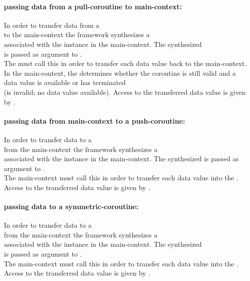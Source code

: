 \paragraph*{passing data from a pull-coroutine to main-context:}
In order to transfer data from a\\
\pullcoro to the main-context the framework synthesizes a\\
\pushcoro associated
with the \pullcoro instance in the main-context. The synthesized\\
\pushcoro is passed as argument to \corofunction.\\
The \corofunction must call this \pushcoroop in order to transfer each
data value back to the main-context.\\
In the main-context, the \pullcorobool determines whether the coroutine is still
valid and a data value is available or \corofunction has terminated\\
(\pullcoro is invalid; no data value available). Access to the transferred data
value is given by \pullcoroget.

\paragraph*{passing data from main-context to a push-coroutine:}
In order to transfer data to a\\
\pushcoro from the main-context the framework synthesizes a\\
\pullcoro associated with the \pushcoro instance in the main-context. The
synthesized \pullcoro is passed as argument to \corofunction.\\
The main-context must call this \pushcoroop in order to transfer each data value
into the \corofunction.\\
Access to the transferred data value is given by \pullcoroget.

\paragraph*{passing data to a symmetric-coroutine:}
In order to transfer data to a\\
\yieldcoro from the main-context the framework synthesizes a\\
\yieldcoro associated with the \callcoro instance in the main-context. The
synthesized\\
\yieldcoro is passed as argument to \corofunction.\\
The main-context must call this \callcoroop in order to transfer each data value
into the \corofunction.\\
Access to the transferred data value is given by \yieldcoroget.

